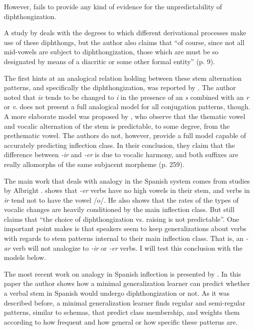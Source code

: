 However, \citeauthor{Harris.1985} fails to provide any kind of evidence for the unpredictability of diphthongization.

A study by \textcite{Eddington.1996} deals with the degrees to which different derivational processes make use of these diphthongs, but the author also claims that ``of course, since not all mid-vowels are subject to diphthongization, those which are must be so designated by means of a diacritic or some other formal entity'' (p. 9).

The first hints at an analogical relation holding between these stem alternation patterns, and specifically the diphthongization, was reported by \textcite{Malkiel.1966}. The author noted that \textit{ie} tends to be changed to \textit{i} in the presence of an \textit{s} combined with an \textit{r} or \textit{v}. \citeauthor{Malkiel.1966} does not present a full analogical model for all conjugation patterns, though. A more elaborate model was proposed by \textcite{Boye.2004}, who observe that the thematic vowel and vocalic alternation of the stem is predictable, to some degree, from the prethematic vowel. The authors do not, however, provide a full model capable of accurately predicting inflection class. In their conclusion, they claim that the difference between \textit{-ir} and \textit{-er} is due to vocalic harmony, and both suffixes are really allomorphs of the same subjacent morpheme (p. 259).

The main work that deals with analogy in the Spanish system comes from studies by Albright \citep{Albright.2001, Albright.2008a, Albright.2009}. \textcite{Albright.2008a} shows that \textit{-er} verbs have no high vowels in their stem, and verbs in \textit{ir} tend not to have the vowel /o/. He also shows that the rates of the types of vocalic changes are heavily conditioned by the main inflection class. But \textcite[3]{Albright.2008a} still claims that ``the choice of diphthongization vs. raising is not predictable''. One important point \textcite{Albright.2008a} makes is that speakers seem to keep generalizations about verbs with regards to stem patterns internal to their main inflection class. That is, an \textit{-ar} verb will not analogize to \textit{-ir} or \textit{-er} verbs. I will test this conclusion with the models below.

The most recent work on analogy in Spanish inflection is presented by \textcite{Albright.2009}. In this paper the author shows how a minimal generalization learner \autocite{Albright.2002} can predict whether a verbal stem in Spanish would undergo diphthongization or not. As it was described before, a minimal generalization learner finds regular and semi-regular patterns, similar to schemas, that predict class membership, and weights them according to how frequent and how general or how specific these patterns are.


